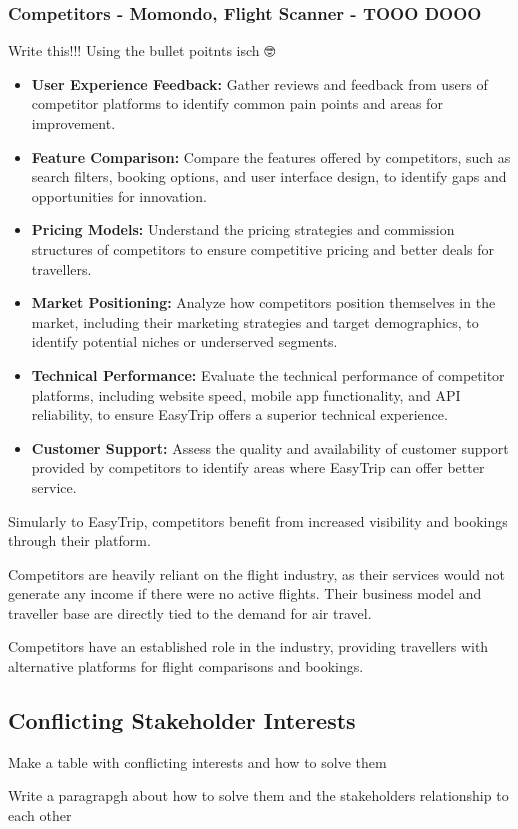 \subsubsection{Competitors - Momondo, Flight Scanner - TOOO DOOO 💩}
Write this!!! Using the bullet poitnts isch 🤓
\begin{itemize}
    \item \textbf{User Experience Feedback:} Gather reviews and feedback from users of competitor platforms to identify common pain points and areas for improvement.
    \item \textbf{Feature Comparison:} Compare the features offered by competitors, such as search filters, booking options, and user interface design, to identify gaps and opportunities for innovation.
    \item \textbf{Pricing Models:} Understand the pricing strategies and commission structures of competitors to ensure competitive pricing and better deals for travellers.
    \item \textbf{Market Positioning:} Analyze how competitors position themselves in the market, including their marketing strategies and target demographics, to identify potential niches or underserved segments.
    \item \textbf{Technical Performance:} Evaluate the technical performance of competitor platforms, including website speed, mobile app functionality, and API reliability, to ensure EasyTrip offers a superior technical experience.
    \item \textbf{Customer Support:} Assess the quality and availability of customer support provided by competitors to identify areas where EasyTrip can offer better service.
\end{itemize}

Simularly to EasyTrip, competitors benefit from increased visibility and bookings through their platform. 

Competitors are heavily reliant on the flight industry, as their services would not generate any income if there were no active flights. Their business model and traveller base are directly tied to the demand for air travel.


Competitors have an established role in the industry, providing travellers with alternative platforms for flight comparisons and bookings. 

\subsection{Conflicting Stakeholder Interests}
Make a table with conflicting interests and how to solve them

Write a paragrapgh about how to solve them and the stakeholders relationship to each other
